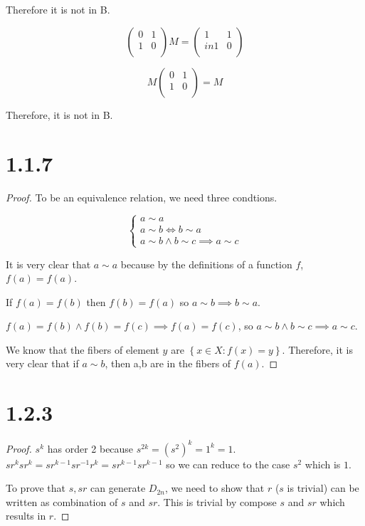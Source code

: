 \documentclass[11pt]{article}
\begin{document}
Therefore it is not in B.

$$
\begin{pmatrix}
	0 & 1 \\
	1 & 0 \\
\end{pmatrix}M=
\begin{pmatrix}
	1 & 1 \\in
	1 & 0 \\
\end{pmatrix}
$$

$$
M\begin{pmatrix}
	0 & 1 \\
	1 & 0 \\
\end{pmatrix}=M
$$

Therefore, it is not in B.

\section*{1.1.7}

\begin{proof}
	To be an equivalence relation, we need three condtions.

	$$
	\begin{cases}
		a \sim a \\ 
		a \sim b \iff b \sim a\\
		a \sim b \land b \sim c \implies a \sim c
	\end{cases}
	$$

	It is very clear that $a \sim a$ because by the definitions of a function $f$, $f(a)=f(a)$.

	If $f(a)=f(b)$ then $f(b)=f(a)$ so $a \sim b \implies b \sim a$.

	$f(a)=f(b)\land f(b)=f(c)\implies f(a)=f(c)$, so $a \sim b \land b \sim c \implies a \sim c$.

	We know that the fibers of element $y$ are $\left\{ x \in X : f(x) = y \right\}$.
	Therefore, it is very clear that if $a \sim b$, then a,b are in the fibers of $f(a)$.
\end{proof}

\section*{1.2.3}

\begin{proof}
	$s^k$ has order 2 because $s^{2k}=(s^2)^k=1^k=1$.
	$sr^ksr^k=sr^{k-1}sr^{-1}r^k=sr^{k-1}sr^{k-1}$ so we can reduce to the case $s^2$ which is $1$.

	To prove that $s,sr$ can generate $D_{2n}$, we need to show that $r$ ($s$ is trivial) can be written as combination of $s$ and $sr$.
	This is trivial by compose $s$ and $sr$ which results in $r$.
\end{proof}
\end{document}
